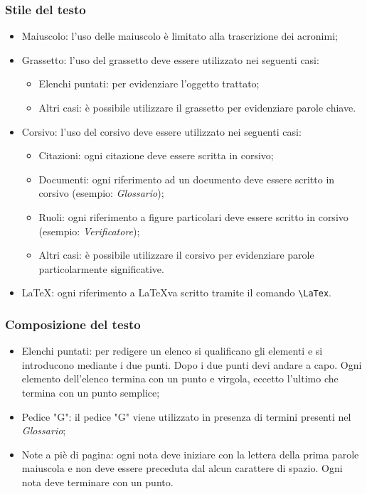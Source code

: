\subsubsection{Stile del testo}
\begin{itemize}
	\item Maiuscolo: l'uso delle maiuscolo è limitato alla trascrizione dei acronimi;
	\item Grassetto: l'uso del grassetto deve essere utilizzato nei seguenti casi: 
	\begin{itemize}
		\item Elenchi puntati: per evidenziare l'oggetto trattato;
		\item Altri casi: è possibile utilizzare il grassetto per evidenziare parole chiave.
	\end{itemize}
	\item Corsivo: l'uso del corsivo deve essere utilizzato nei seguenti casi:
	\begin{itemize}
		\item Citazioni: ogni citazione deve essere scritta in corsivo; 
		\item Documenti: ogni riferimento ad un documento deve essere scritto in corsivo (esempio: \textit{Glossario});
		\item Ruoli: ogni riferimento a figure particolari deve essere scritto in corsivo (esempio: \textit{Verificatore});
		\item Altri casi: è possibile utilizzare il corsivo per evidenziare parole particolarmente significative.
	\end{itemize}
	\item \LaTeX: ogni riferimento a \LaTeX va scritto tramite il comando \verb|\LaTex|.
\end{itemize}

\subsubsection{Composizione del testo}
\begin{itemize}
	\item Elenchi puntati: per redigere un elenco si qualificano gli elementi e si introducono mediante
	i due punti. Dopo i due punti devi andare a capo. Ogni elemento dell'elenco termina con un punto e virgola, eccetto l'ultimo che termina con un punto semplice;
	\item Pedice "G": il pedice "G" viene utilizzato in presenza di termini presenti nel \textit{Glossario};
	\item Note a piè di pagina: ogni nota deve iniziare con la lettera della prima parole maiuscola e non deve essere preceduta dal alcun carattere di spazio. Ogni nota deve terminare con un punto.
\end{itemize}


